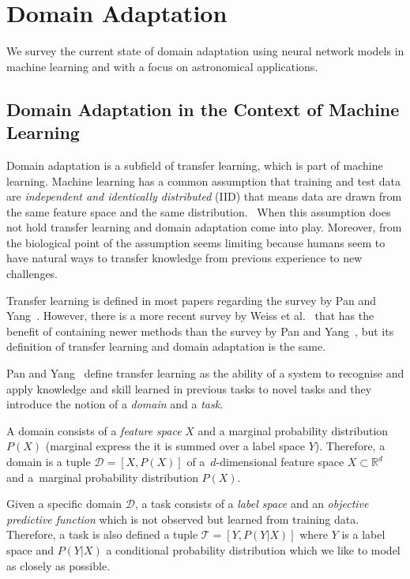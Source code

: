\chapter{Domain Adaptation}
\label{da_chapter}

We survey the current state of domain adaptation using neural network models
in machine learning and with a focus on astronomical applications.

\section{Domain Adaptation in the Context of Machine Learning}

Domain adaptation is a subfield of transfer learning,
which is part of machine learning.
Machine learning has a common assumption that training and test data are
\textit{independent and identically distributed} (IID)
that means data are drawn from the same feature space and the same distribution.~\cite{daume2006}
When this assumption does not hold transfer learning and domain adaptation come into play.
Moreover, from the biological point of the assumption seems limiting
because humans seem to have natural ways to transfer knowledge from previous experience to new challenges.~\cite{torrey2010}

Transfer learning is defined in most papers regarding the survey by Pan and Yang~\cite{pan2010}.
However, there is a more recent survey by Weiss et al.~\cite{weiss2016}
that has the benefit of containing newer methods than the survey by Pan and Yang~\cite{pan2010},
but its definition of transfer learning and domain adaptation is the same.

Pan and Yang~\cite{pan2010} define transfer learning
as the ability of a system to recognise and apply knowledge and skill
learned in previous tasks to novel tasks
and they introduce the notion of a \textit{domain} and a \textit{task}.

A domain consists of a \textit{feature space} \(X\) and a marginal probability distribution \(P(X)\)
(marginal express the it is summed over a label space \(Y\)).
Therefore, a domain is a tuple \(\mathcal{D} = [X, P(X)]\)
of a~\(d\)-dimensional feature space \(X \subset \mathbb{R}^d\)
and a~marginal probability distribution \(P(X)\).

Given a specific domain \(\mathcal{D}\),
a task consists of a \textit{label space} and an \textit{objective predictive function}
which is not observed but learned from training data.
Therefore, a task is also defined a tuple \(\mathcal{T} = [Y, P(Y | X)]\)
where \(Y\) is a label space
and \(P(Y | X)\) a conditional probability distribution
which we like to model as closely as possible.

